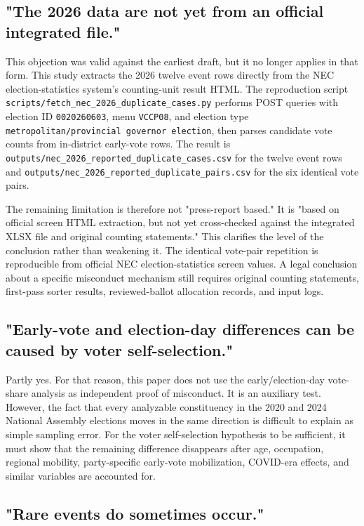 \documentclass[preprint]{IEIE}
\begin{document}
\subsection{"The 2026 data are not yet from an official integrated file."}

This objection was valid against the earliest draft, but it no longer applies in that form. This study extracts the 2026 twelve event rows directly from the NEC election-statistics system's counting-unit result HTML. The reproduction script \texttt{scripts/fetch\_nec\_2026\_duplicate\_cases.py} performs POST queries with election ID \texttt{0020260603}, menu \texttt{VCCP08}, and election type \texttt{metropolitan/provincial governor election}, then parses candidate vote counts from in-district early-vote rows. The result is \texttt{outputs/nec\_2026\_reported\_duplicate\_cases.csv} for the twelve event rows and \texttt{outputs/nec\_2026\_reported\_duplicate\_pairs.csv} for the six identical vote pairs.

The remaining limitation is therefore not "press-report based." It is "based on official screen HTML extraction, but not yet cross-checked against the integrated XLSX file and original counting statements." This clarifies the level of the conclusion rather than weakening it. The identical vote-pair repetition is reproducible from official NEC election-statistics screen values. A legal conclusion about a specific misconduct mechanism still requires original counting statements, first-pass sorter results, reviewed-ballot allocation records, and input logs.

\subsection{"Early-vote and election-day differences can be caused by voter self-selection."}

Partly yes. For that reason, this paper does not use the early/election-day vote-share analysis as independent proof of misconduct. It is an auxiliary test. However, the fact that every analyzable constituency in the 2020 and 2024 National Assembly elections moves in the same direction is difficult to explain as simple sampling error. For the voter self-selection hypothesis to be sufficient, it must show that the remaining difference disappears after age, occupation, regional mobility, party-specific early-vote mobilization, COVID-era effects, and similar variables are accounted for.

\subsection{"Rare events do sometimes occur."}
\end{document}

